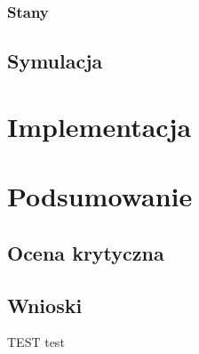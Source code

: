 \documentclass{article}
\begin{document}
\subsubsection{Stany}

\subsection{Symulacja}
\newpage
\section{Implementacja}
\newpage
\section{Podsumowanie}
\subsection{Ocena krytyczna}

\subsection{Wnioski}
\par TEST \cite{ug230} \cite{wave} \cite{zsk} test
\newpage




\end{document}

